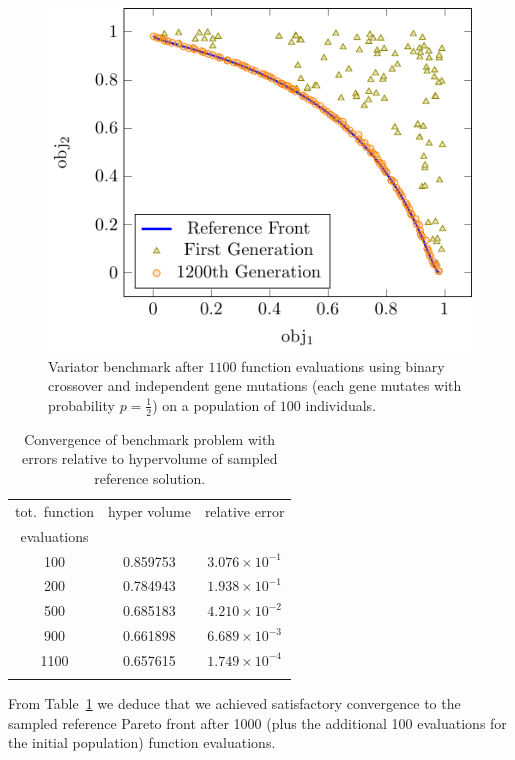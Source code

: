 \begin{figure}
  \centering
    \includegraphics[width=0.7\linewidth]{figures/valid_front}
  \caption{Variator benchmark after $1100$ function evaluations using binary
           crossover and independent gene mutations (each gene mutates with
           probability $p=\frac{1}{2}$) on a population of $100$
           individuals.}
  \label{fig:pisa_bench}
\end{figure}

\begin{table}%
\begin{center}
  \caption{Convergence of benchmark problem with errors relative to
    hypervolume of sampled reference solution.}
  \label{tbl:bench_rms_error}
  \begin{tabular}{c|c|c}
    \hline\noalign{\smallskip}
    tot.\ function  & hyper volume & relative error\\
    evaluations    & & \\
    \noalign{\smallskip}\hline\noalign{\smallskip}
    100  &  0.859753 & $3.076 \times 10^{-1}$ \\
    200  &  0.784943 & $1.938 \times 10^{-1}$ \\
    500  &  0.685183 & $4.210 \times 10^{-2}$ \\
    900  &  0.661898 & $6.689 \times 10^{-3}$ \\
    1100 &  0.657615 & $1.749 \times 10^{-4}$ \\
    \noalign{\smallskip}\hline
  \end{tabular}
\end{center}
\end{table}

From Table~\ref{tbl:bench_rms_error} we deduce that we achieved satisfactory
  convergence to the sampled reference Pareto front after 1000 (plus the
  additional 100 evaluations for the initial population) function evaluations.




